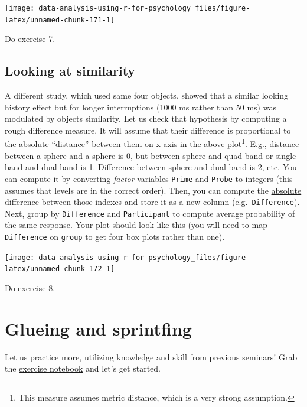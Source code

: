 \documentclass[
]{book}
\begin{document}
\begin{center}\texttt{[image: data-analysis-using-r-for-psychology\_files/figure-latex/unnamed-chunk-171-1]} \end{center}

Do exercise 7.

\hypertarget{looking-at-similarity}{%
\section{Looking at similarity}\label{looking-at-similarity}}

A different study, which used same four objects, showed that a similar looking history effect but for longer interruptions (1000 ms rather than 50 ms) was modulated by objects similarity. Let us check that hypothesis by computing a rough difference measure. It will assume that their difference is proportional to the absolute ``distance'' between them on x-axis in the above plot\footnote{This measure assumes metric distance, which is a very strong assumption.}. E.g., distance between a sphere and a sphere is 0, but between sphere and quad-band or single-band and dual-band is 1. Difference between sphere and dual-band is 2, etc. You can compute it by converting \emph{factor} variables \texttt{Prime} and \texttt{Probe} to integers (this assumes that levels are in the correct order). Then, you can compute the \href{https://stat.ethz.ch/R-manual/R-devel/library/base/html/MathFun.html}{absolute difference} between those indexes and store it as a new column (e.g.~\texttt{Difference}). Next, group by \texttt{Difference} and \texttt{Participant} to compute average probability of the same response. Your plot should look like this (you will need to map \texttt{Difference} on \texttt{group} to get four box plots rather than one).

\begin{center}\texttt{[image: data-analysis-using-r-for-psychology\_files/figure-latex/unnamed-chunk-172-1]} \end{center}

Do exercise 8.

\hypertarget{seminar08}{%
\chapter{Glueing and sprintfing}\label{seminar08}}

Let us practice more, utilizing knowledge and skill from previous seminars! Grab the \href{notebooks/Seminar\%2008.Rmd}{exercise notebook} and let's get started.
\end{document}
